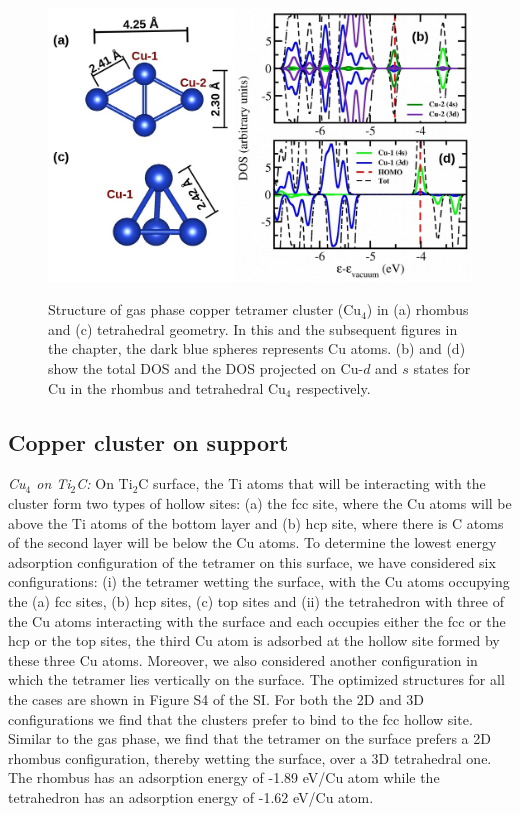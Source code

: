 \begin{figure}[ht]
 \begin{center}
    \includegraphics[width=12cm]{./Appendix2/Appendix2_figures/gas_phase_4.jpg} \\[0cm]
 \end{center}
 \caption{ Structure of gas phase copper tetramer cluster (Cu$_4$) in  (a) rhombus  and (c) tetrahedral geometry. In this and the subsequent figures in the chapter, the
 dark blue spheres represents Cu atoms. (b) and (d) show the total DOS and the DOS
 projected on Cu-$d$ and $s$ states for Cu in the rhombus and tetrahedral Cu$_4$ respectively.}
  \label{fig:2}
\end{figure}

\subsection{Copper cluster on support}

\noindent \textit{Cu$_4$ on Ti$_2$C:} On Ti$_2$C surface, the Ti atoms that will be interacting with the
cluster form two types of hollow sites: (a) the fcc site, where the Cu atoms will be above the Ti atoms of the bottom layer and (b) hcp site, where there is C atoms of the second layer will be below the Cu atoms. To determine the lowest energy adsorption configuration of the tetramer on this surface, we have considered six configurations: (i) the tetramer wetting the surface, with the Cu atoms occupying the (a) fcc sites, (b) hcp sites, (c) top sites and (ii) the tetrahedron with three of the Cu atoms interacting with the surface and each occupies either the fcc or the hcp or the top sites, the third Cu atom is adsorbed at the hollow site formed by these three Cu atoms. Moreover, we also considered another configuration in which the tetramer lies
vertically on the surface. The optimized structures for all the cases are shown in Figure S4 of the SI. For both the 2D and 3D configurations we find that the clusters prefer to bind to the fcc hollow site. Similar to the gas phase, we find that the tetramer on the surface prefers a 2D rhombus configuration, thereby wetting the surface, over a 3D tetrahedral one. The rhombus has an adsorption energy of -1.89 eV/Cu atom while the tetrahedron has an adsorption energy of -1.62 eV/Cu atom.


